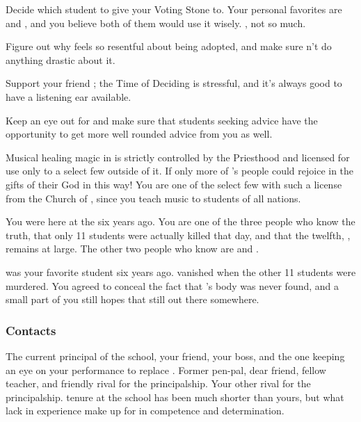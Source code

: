 \documentclass[char]{GL2020}
\begin{document}
\begin{itemz}
    \item Decide which student to give your Voting Stone to. Your personal favorites are \cAdopted{} and \cDisney{}, and you believe both of them would use it wisely. \cLibAssist{}, not so much.
    \item Figure out why \cAdopted{} feels so resentful about being adopted, and make sure \cAdopted{\theydo}n't do anything drastic about it.
    \item Support your friend \cInterpol{}; the Time of Deciding is stressful, and it’s always good to have a listening ear available.
    \item Keep an eye out for \cEthics{} and make sure that students seeking \cEthics{\their} advice have the opportunity to get more well rounded advice from you as well.
\end{itemz}

\begin{itemz}[Notes]
    \item Musical healing magic in \pFarm{} is strictly controlled by the Priesthood and licensed for use only to a select few outside of it. If only more of \cFarmGod{}'s people could rejoice in the gifts of their God in this way! You are one of the select few with such a license from the Church of \cFarmGod{}, since you teach music to students of all nations.
    \item You were here at the \pSchool{} six years ago. You are one of the three people who know the truth, that only 11 students were actually killed that day, and that the twelfth, \cKidScientist{\full}, remains at large. The other two people who know are \cDiplomat{\full} and \cPrincipal{\full}.
    \item \cKidScientist{\full} was your favorite student six years ago. \cKidScientist{\They} vanished when the other 11 students were murdered. You agreed to conceal the fact that \cKidScientist{}'s body was never found, and a small part of you still hopes that \cKidScientist{\theyare} still out there somewhere.
\end{itemz}

\subsubsection*{Contacts}
\begin{contacts}
    \contact{\cPrincipal{}} The current principal of the school, your friend, your boss, and the one keeping an eye on your performance to replace \cPrincipal{\them}.
    \contact{\cBeetle{}} Former pen-pal, dear friend, fellow teacher, and friendly rival for the principalship.
    \contact{\cChupSecond{}} Your other rival for the principalship. \cChupSecond{\Their} tenure at the school has been much shorter than yours, but what \cChupSecond{\they} lack in experience \cChupSecond{\they} make up for in competence and determination.
\end{contacts}
\end{document}
